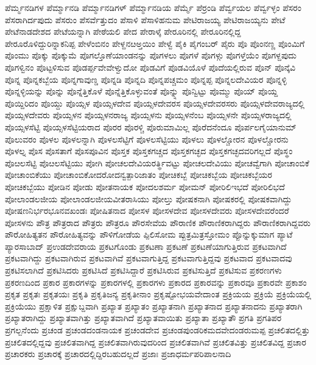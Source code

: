 {ಪೆರ್ಮ್ಮನಡಿಗಳ
ಪೆರ್ಮ್ಮಾನಡಿ
ಪೆರ್ಮ್ಮಾನಡಿಗಳ್
ಪೆರ್ಮ್ಮಾನಡಿಯ
ಪೆರ್ಮ್ಮೆ
ಪೆರ್ರಂಡಿ
ಪೆರ್ವ್ವಯಲ
ಪೆರ್ವ್ವಳ್ಳಂ
ಪೆಸರಂ
ಪೆಸರಾಗಿರ್ದಪುದು
ಪೆಸರುಂ
ಪೆಸರ್ವೆತ್ತುದಂ
ಪೆಸಾಳಿ
ಪೆಸಾಳಿಹನುಮ
ಪೇಟಿರಾಜಯ್ಯ
ಪೇಟಿರಾಜಯ್ಯನು
ಪೇಟೆ
ಪೇಟೆನಾಡದೇಶದ
ಪೇಟೆಯನ್ನಾಗಿ
ಪೇಠೆಯಲಿ
ಪೇದ
ಪೇರಾಳ್ಕೆ
ಪೇರೂರಿನಲ್ಲಿ
ಪೇರೂರಿನಲ್ಲಿದ್ದ
ಪೇರೂರೊಳಿದ್ದುರಿನ್ನಾಕನಿಪ್ಪ
ಪೇಳೆಂಬಿನಂ
ಪೇಳ್ದನೞಅ್ತಯಿಂ
ಪೇಳ್ವೆ
ಪೈಕಿ
ಪೈಗಂಬರ್
ಪೈರು
ಪೊ
ಪೊಂನಣ್ಣ
ಪೊಂಮಿಗೆ
ಪೊಂಮು
ಪೊಕ್ಕು
ಪೊಕ್ಕುಮೆ
ಪೊಗಲ್ತೊಣೆಯಾಂಡನನ್ನು
ಪೊಗಳಲು
ಪೊಗಳೆ
ಪೊಗಳ್ಗು
ಪೊಗಳ್ತೆಯೆಂ
ಪೊಗಳ್ದಪುದು
ಪೊಗಳ್ವಿನಂ
ಪೊಟ್ಟಳಿಸುವ
ಪೊಡರ್ಪ್ಪವೇವೇಳ್ವುದೋ
ಪೊಡವಿಗೆ
ಪೊಡವಿಯೊಳೆ
ಪೊದೆಯಲ್ಲಿರುವ
ಪೊನ್
ಪೊನ್ಕೆವಿ
ಪೊನ್ನ
ಪೊನ್ನಕಬ್ಬೆಯ
ಪೊನ್ನಗಾವುಣ್ಡ
ಪೊನ್ನಡಿ
ಪೊನ್ನದಿ
ಪೊನ್ನಪಚ್ಚಮಂ
ಪೊನ್ನಪ್ಪ
ಪೊನ್ನಲದೇವಿಯರ
ಪೊನ್ನಳ್ಳಿ
ಪೊನ್ನಳ್ಳಿಯನ್ನು
ಪೊನ್ನು
ಪೊನ್ನೆತ್ತಿಕೊಳೆ
ಪೊನ್ನೆತ್ತಿಕೊಳ್ಳುವಂತೆ
ಪೊನ್ನ್ನು
ಪೊನ್ವಿಟ್ಟು
ಪೊಮ್ಮು
ಪೊಯ್
ಪೊಯ್ದ
ಪೊಯ್ದಿರಿದಂ
ಪೊಯ್ದು
ಪೊಯ್ಸಳ
ಪೊಯ್ಸಳದೇವ
ಪೊಯ್ಸಳದೇವರಸ
ಪೊಯ್ಸಳದೇವರಸರು
ಪೊಯ್ಸಳದೇವರಾಜ್ಯದಲ್ಲಿ
ಪೊಯ್ಸಳದೇವರು
ಪೊಯ್ಸಳನ
ಪೊಯ್ಸಳನರಾಜ್ಯ
ಪೊಯ್ಸಳನು
ಪೊಯ್ಸಳನೆಂಬ
ಪೊಯ್ಸಳನೇ
ಪೊಯ್ಸಳರಾಜ್ಯದಲ್ಲಿ
ಪೊಯ್ಸಳಸೆಟ್ಟಿ
ಪೊಯ್ಸಳಸೆಟ್ಟಿಯರಾದ
ಪೊರರ
ಪೊರಳ್ಚಿ
ಪೊರುಮಾಮಿಲ್ಲ
ಪೊರೆದನೆಂದೂ
ಪೊರ್ಪಲಗೈಯಾನುಮ್
ಪೊಲುವರಂ
ಪೊಳಲ
ಪೊಳಲನ್ನಾಗಿ
ಪೊಳಲಸೆಟ್ಟಿಗೆ
ಪೊಳಲಸೆಟ್ಟಿಯು
ಪೊಳಲು
ಪೊಳಲ್ಚೋರನ
ಪೊಳಲ್ಚೋರನು
ಪೊಳಲ್ನ
ಪೊಸ
ಪೊಸತಾಗೆ
ಪೊಸಪೂವಿನ
ಪೊಸ್ತಕ
ಪೊಸ್ತಕಗಚ್ಚದ
ಪೊಸ್ತಕಗಚ್ಛದ
ಪೊಸ್ತಕಗಚ್ಛದವರಿಗಲ್ಲದೆ
ಪೊಸ್ಥಂ
ಪೊೞಲಸೆಟ್ಟಿ
ಪೊೞಲಸೆಟ್ಟಿಯು
ಪೋಗಿ
ಪೋಚಲದೇವಿಯರರ್ತ್ಥಿವಟ್ಟು
ಪೋಚಲದೇವಿಯು
ಪೋಚವ್ವೆಗಾಗಿ
ಪೋಚಾಂಬಿಕೆ
ಪೋಚಾಂಬಿಕೆಯು
ಪೋಚಾಂಬಿಕೋದರೋದನ್ವತ್ಪಾರಿಜಾತಂ
ಪೋಚಿಕಬ್ಬೆ
ಪೋಚಿಕಬ್ಬೆಯ
ಪೋಚಿಕಬ್ಬೆಯರ
ಪೋಚಿಕಬ್ಬೆಯು
ಪೋಡಿನ
ಪೋಡು
ಪೋತನಾಯಕ
ಪೋದಲಶರ್ಮ
ಪೋಮನ್
ಪೋರಿಲಿಇಭದೆ
ಪೋರಿಲಿಭದೆ
ಪೋಲಾಂಡಲಜೀಯ
ಪೋಲಾಂಡಲಜೀಯವೀತರಾಸಿಯು
ಪೋಲ್ತು
ಪೋಷಕನಾಗಿ
ಪೋಷಕರಲ್ಲಿ
ಪೋಷಕವಾಗಿದ್ದು
ಪೋಷಣನಿರ್ಭರಭೂನವಖಂಡಃ
ಪೋಷಿತನಾದ
ಪೋಸಳ
ಪೋಸಳದೇವ
ಪೋಸಳದೇವರು
ಪೋಸಳದೇವರೆಂದರೆ
ಪೋಸಳನು
ಪೌತ್ರ
ಪೌತ್ರರಾದ
ಪೌತ್ರರು
ಪೌತ್ರರೂ
ಪೌರಸೇವೆಯ
ಪೌರಾಣಿಕ
ಪೌರಾಣಿಕರಾಗಿದ್ದರು
ಪೌರಾಣಿಕರಾಗಿದ್ದವರು
ಪೌರೋಹಿತ್ಯತನ
ಪೌರೋಹಿತ್ಯವನ್ನು
ಪೌಳಿಗೋಡೆಯ
ಪ್ಪಿಲಿಸೋಮ
ಪ್ಪುತ್ರಮಿತ್ರಸ್ತೋಮಂ
ಪ್ಪೊನ್ನುಕ್ಕುಮಾಗ
ಪ್ಯಾಟೆ
ಪ್ಯಾರಸಾಬಾದ್
ಪ್ರಉಡದೇವರಾಯ
ಪ್ರಕಟಗೊಂಡು
ಪ್ರಕಟಣಾ
ಪ್ರಕಟಣೆ
ಪ್ರಕಟಣೆಯಾಗುತ್ತಿರುವ
ಪ್ರಕಟವಾಗಿದೆ
ಪ್ರಕಟವಾಗಿದ್ದು
ಪ್ರಕಟವಾಗಿರುವ
ಪ್ರಕಟವಾಗಿವೆ
ಪ್ರಕಟವಾಗುತ್ತಿದ್ದ
ಪ್ರಕಟವಾಗುತ್ತಿದ್ದವು
ಪ್ರಕಟವಾದ
ಪ್ರಕಟವಾದವು
ಪ್ರಕಟಿಸಲಾಗಿದೆ
ಪ್ರಕಟಿಸಿದರು
ಪ್ರಕಟಿಸಿದೆ
ಪ್ರಕಟಿಸಿದ್ದಾರೆ
ಪ್ರಕಟಿಸಿರುವ
ಪ್ರಕಟಿಸುತ್ತಿದೆ
ಪ್ರಕಟಿಸುವ
ಪ್ರಕರಣಗಳು
ಪ್ರಕರಣದಿಂದ
ಪ್ರಕಾರ
ಪ್ರಕಾರಗಳನ್ನು
ಪ್ರಕಾರಗಳಲ್ಲಿ
ಪ್ರಕಾರಗಳು
ಪ್ರಕಾರದ
ಪ್ರಕಾರವನ್ನು
ಪ್ರಕಾರವೂ
ಪ್ರಕಾರವೇ
ಪ್ರಕಾಶಂ
ಪ್ರಕೃತ
ಪ್ರಕೃತಃ
ಪ್ರಕೃತಯಃ
ಪ್ರಕೃತಿ
ಪ್ರಕೃತಿಜನ್ಯ
ಪ್ರಕೃತೀನಾಂ
ಪ್ರಕೃಷ್ಟೋಭಯವೇದಾಂತ
ಪ್ರಕ್ರಿಯಯ
ಪ್ರಕ್ರಿಯೆ
ಪ್ರಕ್ರಿಯೆಯಲ್ಲಿ
ಪ್ರಕ್ರಿಯೆಯು
ಪ್ರಕ್ಷಾಳಿತ
ಪ್ರಕ್ಷುಬ್ದವಾಗಿ
ಪ್ರಖ್ಯಾತ
ಪ್ರಖ್ಯಾತಂ
ಪ್ರಖ್ಯಾತನಾಗಿ
ಪ್ರಖ್ಯಾತನಾದ
ಪ್ರಖ್ಯಾತನಾದನು
ಪ್ರಖ್ಯಾತರಾಗಿ
ಪ್ರಖ್ಯಾತರಾಗಿದ್ದು
ಪ್ರಖ್ಯಾತವಾಗಿತ್ತು
ಪ್ರಖ್ಯಾತವಾಗಿದೆ
ಪ್ರಖ್ಯಾತವಾಯಿತು
ಪ್ರಖ್ಯಾತಾ
ಪ್ರಖ್ಯಾತೌ
ಪ್ರಗತಿ
ಪ್ರಗತಿಪರ
ಪ್ರಗಲ್ಬನೆಂದು
ಪ್ರಚಂಡ
ಪ್ರಚಂಡದಂಡನಾಯಕ
ಪ್ರಚಂಡದೇವ
ಪ್ರಚಂಡಪುಂಡರಿಕಮದವೇದಂಡರುಮಪ್ಪ
ಪ್ರಚಲಿತದಲ್ಲಿತ್ತು
ಪ್ರಚಲಿತದಲ್ಲಿದ್ದವು
ಪ್ರಚಲಿತವಾಗಿದ್ದ
ಪ್ರಚಲಿತವಾಗಿರುವುದರಿಂದ
ಪ್ರಚಲಿತವಾಗಿವೆ
ಪ್ರಚಲಿತವಿತ್ತು
ಪ್ರಚಲಿತವಿದ್ದ
ಪ್ರಚಾರ
ಪ್ರಚಾರಕರು
ಪ್ರಚಾರಕ್ಕೆ
ಪ್ರಚಾರದಲ್ಲಿದ್ದಿರಬಹುದಲ್ಲದೆ
ಪ್ರಜಾಃ
ಪ್ರಜಾಧರ್ಮಪರಿಪಾಲನಾದಿ
}

